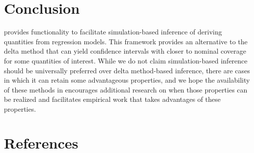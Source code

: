 \hypertarget{conclusion}{%
\section{Conclusion}\label{conclusion}}

 provides functionality to facilitate simulation-based inference of deriving quantities from regression models. This framework provides an alternative to the delta method that can yield confidence intervals with closer to nominal coverage for some quantities of interest. While we do not claim simulation-based inference should be universally preferred over delta method-based inference, there are cases in which it can retain some advantageous properties, and we hope the availability of these methods in  encourages additional research on when those properties can be realized and facilitates empirical work that takes advantages of these properties.

\hypertarget{references}{%
\section*{References}\label{references}}

